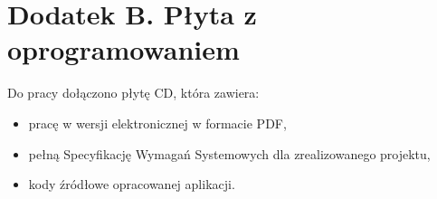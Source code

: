 \documentclass[10pt,twoside,a4paper]{report}
\begin{document}
\chapter*{Dodatek B. Płyta z oprogramowaniem}
\par\begin{flushleft}
Do pracy dołączono płytę CD, która zawiera:
\end{flushleft}
\begin{itemize}
\item pracę w wersji elektronicznej w formacie PDF,
\item pełną Specyfikację Wymagań Systemowych dla zrealizowanego projektu,
\item kody źródłowe opracowanej aplikacji.
\end{itemize}


\end{document}

